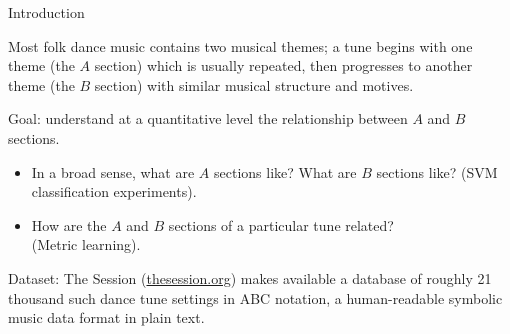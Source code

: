 \documentclass[letterpaper]{amsart}
\begin{document}
\begin{center}
\Huge
Introduction
\end{center}
\huge

Most folk dance music contains two musical themes; a tune begins with one theme (the $A$ section) which is usually repeated, then progresses to another theme (the $B$ section) with similar musical structure and motives.

Goal: understand at a quantitative level the relationship between $A$ and $B$ sections.
\begin{itemize}
\item In a broad sense, what are $A$ sections like? What are $B$ sections like? (SVM classification experiments).

\item How are the $A$ and $B$ sections of a particular tune related? \\(Metric learning).
\end{itemize}

Dataset: The Session (\url{thesession.org}) makes available a database of roughly 21 thousand such dance tune settings in ABC notation, a human-readable symbolic music data format in plain text.
\end{document}
